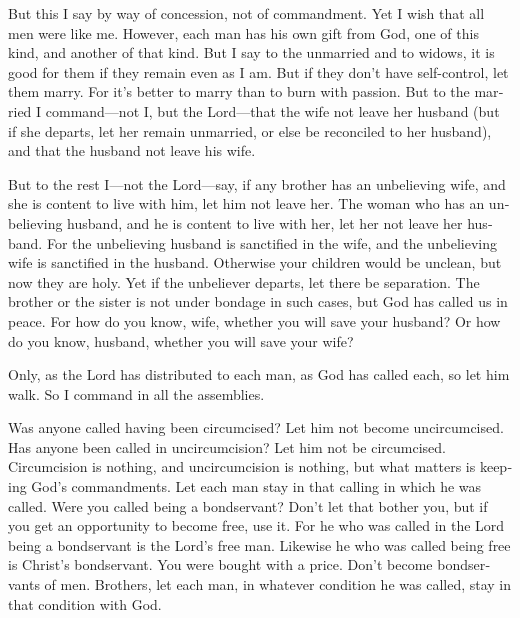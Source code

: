 \begin{paracol}{2}
\begin{otherlanguage}{english}
 But this I say by way of concession, not of commandment.
 Yet I wish that all men were like me. However, each man
has his own gift from God, one of this kind, and another of that kind.
 But I say to the unmarried and to widows, it is good for
them if they remain even as I am.  But if they don't have
self-control, let them marry. For it's better to marry than to burn with
passion.  But to the married I command---not I, but the
Lord---that the wife not leave her husband  (but if she
departs, let her remain unmarried, or else be reconciled to her
husband), and that the husband not leave his wife.

 But to the rest I---not the Lord---say, if any brother
has an unbelieving wife, and she is content to live with him, let him
not leave her.  The woman who has an unbelieving husband,
and he is content to live with her, let her not leave her husband.
 For the unbelieving husband is sanctified in the wife,
and the unbelieving wife is sanctified in the husband. Otherwise your
children would be unclean, but now they are holy.  Yet if
the unbeliever departs, let there be separation. The brother or the
sister is not under bondage in such cases, but God has called us in
peace.  For how do you know, wife, whether you will save
your husband? Or how do you know, husband, whether you will save your
wife?

 Only, as the Lord has distributed to each man, as God
has called each, so let him walk. So I command in all the assemblies.

 Was anyone called having been circumcised? Let him not
become uncircumcised. Has anyone been called in uncircumcision? Let him
not be circumcised.  Circumcision is nothing, and
uncircumcision is nothing, but what matters is keeping God's
commandments.  Let each man stay in that calling in which
he was called.  Were you called being a bondservant?
Don't let that bother you, but if you get an opportunity to become free,
use it.  For he who was called in the Lord being a
bondservant is the Lord's free man. Likewise he who was called being
free is Christ's bondservant.  You were bought with a
price. Don't become bondservants of men.  Brothers, let
each man, in whatever condition he was called, stay in that condition
with God.


\end{otherlanguage}
\end{paracol}
